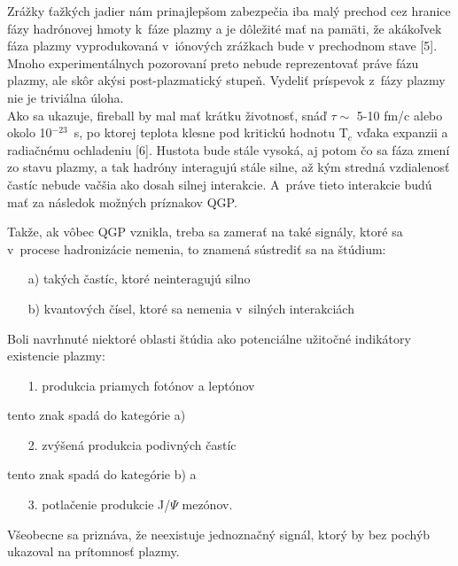 Zrážky ťažkých jadier nám prinajlepšom
zabezpečia iba malý prechod cez hranice fázy
hadrónovej hmoty k~fáze plazmy a je dôležité  mať na
pamäti, že akákoľvek fáza plazmy vyprodukovaná
v~iónových zrážkach bude v prechodnom stave [5]. Mnoho
experimentálnych pozorovaní preto nebude reprezentovať
práve fázu plazmy, ale skôr akýsi post-plazmatický stupeň.
Vydeliť príspevok z~fázy plazmy nie je triviálna úloha. \\
\hspace*{0.45cm} Ako sa ukazuje, fireball by mal mať krátku
životnosť, snáď $\tau\sim$ 5-10 fm/c alebo okolo
10$^{-23}$~s, po ktorej teplota klesne pod kritickú hodnotu T$_{c}$
vďaka expanzii a radiačnému ochladeniu [6]. Hustota bude
stále vysoká, aj potom čo sa fáza zmení zo stavu plazmy, a tak
hadróny interagujú stále silne, až kým stredná
vzdialenosť častíc nebude vačšia ako dosah silnej
interakcie. A~práve tieto interakcie budú mať za následok
 možných príznakov QGP.

Takže, ak vôbec QGP vznikla, treba sa zamerať na také
signály, ktoré sa  v~procese hadronizácie nemenia, to znamená
sústrediť sa na štúdium:
\begin{enumerate}
\item[a)] takých častíc, ktoré neinteragujú silno
\item[b)] kvantových čísel, ktoré sa nemenia v~silných
  interakciách
\end{enumerate}
Boli navrhnuté niektoré oblasti štúdia ako potenciálne
užitočné indikátory existencie plazmy:
\begin{enumerate}
\item[1.] produkcia priamych fotónov a leptónov
\end{enumerate}
tento znak spadá do kategórie a)
\begin{enumerate}
\item[2.] zvýšená produkcia podivných častíc
\end{enumerate}
tento znak spadá do kategórie b) a
\begin{enumerate}
\item[3.] potlačenie produkcie J/$\Psi$ mezónov.
\end{enumerate}
Všeobecne sa priznáva, že neexistuje jednoznačný signál, ktorý by bez pochýb
ukazoval na prítomnosť plazmy.


